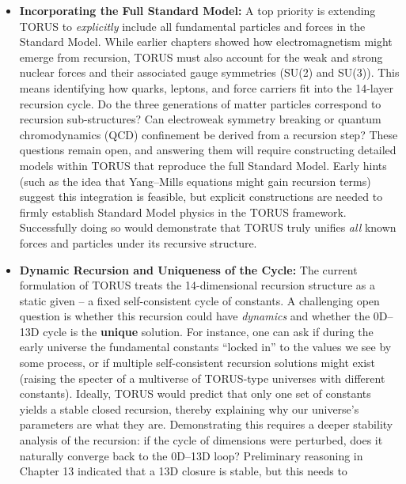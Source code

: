 \documentclass[
]{article}
\begin{document}
\begin{itemize}
\item
  \textbf{Incorporating the Full Standard Model:} A top priority is
  extending TORUS to \emph{explicitly} include all fundamental particles
  and forces in the Standard Model. While earlier chapters showed how
  electromagnetism might emerge from recursion, TORUS must also account
  for the weak and strong nuclear forces and their associated gauge
  symmetries (SU(2) and SU(3))\hspace{0pt}. This means identifying how
  quarks, leptons, and force carriers fit into the 14-layer recursion
  cycle. Do the three generations of matter particles correspond to
  recursion sub-structures? Can electroweak symmetry breaking or quantum
  chromodynamics (QCD) confinement be derived from a recursion step?
  These questions remain open, and answering them will require
  constructing detailed models within TORUS that reproduce the full
  Standard Model. Early hints (such as the idea that Yang--Mills
  equations might gain recursion terms) suggest this integration is
  feasible, but explicit constructions are needed to firmly establish
  Standard Model physics in the TORUS framework\hspace{0pt}.
  Successfully doing so would demonstrate that TORUS truly unifies
  \emph{all} known forces and particles under its recursive structure.
\item
  \textbf{Dynamic Recursion and Uniqueness of the Cycle:} The current
  formulation of TORUS treats the 14-dimensional recursion structure as
  a static given -- a fixed self-consistent cycle of constants. A
  challenging open question is whether this recursion could have
  \emph{dynamics} and whether the 0D--13D cycle is the \textbf{unique}
  solution. For instance, one can ask if during the early universe the
  fundamental constants ``locked in'' to the values we see by some
  process, or if multiple self-consistent recursion solutions might
  exist (raising the specter of a multiverse of TORUS-type universes
  with different constants)\hspace{0pt}. Ideally, TORUS would predict
  that only one set of constants yields a stable closed recursion,
  thereby explaining why our universe's parameters are what they are.
  Demonstrating this requires a deeper stability analysis of the
  recursion: if the cycle of dimensions were perturbed, does it
  naturally converge back to the 0D--13D loop? Preliminary reasoning in
  Chapter 13 indicated that a 13D closure is stable, but this needs to

\end{itemize}
\end{document}
